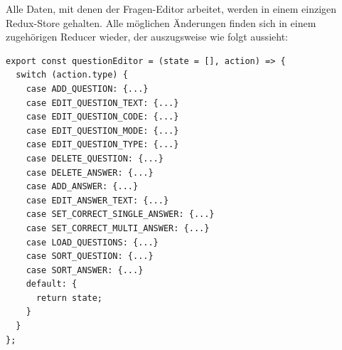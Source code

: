 Alle Daten, mit denen der Fragen-Editor arbeitet, werden in einem einzigen Redux-Store gehalten. Alle möglichen Änderungen finden sich in einem zugehörigen Reducer wieder, der auszugsweise wie folgt aussieht:


\begin{minipage}{\linewidth}
\begin{lstlisting}[caption={Auszug aus dem Reducer für den Fragen-Editor (aus: src/server/reducers/questions.js)}]
export const questionEditor = (state = [], action) => {
  switch (action.type) {
    case ADD_QUESTION: {...}
    case EDIT_QUESTION_TEXT: {...}
    case EDIT_QUESTION_CODE: {...}
    case EDIT_QUESTION_MODE: {...}
    case EDIT_QUESTION_TYPE: {...}
    case DELETE_QUESTION: {...}
    case DELETE_ANSWER: {...}
    case ADD_ANSWER: {...}
    case EDIT_ANSWER_TEXT: {...}
    case SET_CORRECT_SINGLE_ANSWER: {...}
    case SET_CORRECT_MULTI_ANSWER: {...}
    case LOAD_QUESTIONS: {...}
    case SORT_QUESTION: {...}
    case SORT_ANSWER: {...}
    default: {
      return state;
    }
  }
};
\end{lstlisting}
\end{minipage}